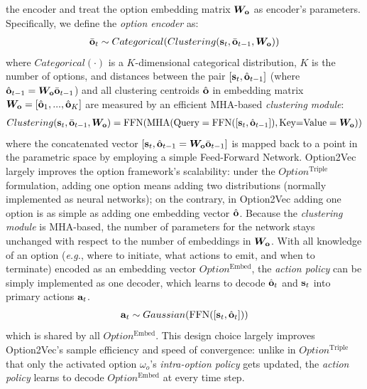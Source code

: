 \documentclass{article}
\begin{document}
the encoder and treat the option embedding matrix ${\bm{W}}_{{\mathbf{o}}}$ as
encoder's parameters. Specifically, we define the \emph{option
  encoder} as:
\begin{align}
  \label{eq:net_encoder}
  \bar{{\mathbf{o}}}_t\sim Categorical(Clustering({\mathbf{s}}_t,\bar{{\mathbf{o}}}_{t-1},{\bm{W}}_{{\mathbf{o}}}))
\end{align}
where $Categorical(\cdot)$ is a $K$-dimensional categorical distribution, $K$ is the number of options, and distances between the pair $[{\mathbf{s}}_t,\hat{{\mathbf{o}}}_{t-1}]$ (where $\hat{{\mathbf{o}}}_{t-1}={\bm{W}}_{{\mathbf{o}}}\bar{{\mathbf{o}}}_{t-1}$) and
all clustering centroids $\hat{{\mathbf{o}}}$ in embedding matrix ${\bm{W}}_{{\mathbf{o}}}=[\hat{{\mathbf{o}}}_1,...,\hat{{\mathbf{o}}}_K]$ are measured by an
efficient MHA-based \emph{clustering module}:
\vspace{-1mm}\begin{align}
  \label{eq:net_encoder}
Clustering({\mathbf{s}}_t,\bar{{\mathbf{o}}}_{t-1},{\bm{W}}_{{\mathbf{o}}})=\text{FFN}(\text{MHA}(\text{Query}=\text{FFN}([{\mathbf{s}}_t,\hat{{\mathbf{o}}}_{t-1}]),
\text{Key=Value}={\bm{W}}_{{\mathbf{o}}}))
\end{align}
where the concatenated vector $[{\mathbf{s}}_t,\hat{{\mathbf{o}}}_{t-1}={\bm{W}}_{{\mathbf{o}}}\bar{{\mathbf{o}}}_{t-1}]$ is
mapped back to a point in the parametric space by employing a
simple Feed-Forward Network. Option2Vec largely improves the
option framework's scalability: under the $Option^{\textrm{Triple}}$
formulation, adding one option means adding two distributions
(normally implemented as neural networks); on the contrary, in
Option2Vec adding one option is as simple as adding one embedding
vector $\hat{{\mathbf{o}}}$. Because the \emph{clustering module} is
MHA-based, the number of parameters for the network stays unchanged
with respect to the number of embeddings in ${\bm{W}}_{{\mathbf{o}}}$.
With all knowledge of an option (\textit{e.g.}, where to initiate, what
actions to emit, and when to terminate) encoded as an embedding vector $Option^{\textrm{Embed}}$, the
\emph{action policy} can be simply implemented as one decoder,
which learns to decode $\hat{{\mathbf{o}}}_t$ and ${\mathbf{s}}_t$ into primary
actions ${\mathbf{a}}_t$.
\begin{align}
  \label{eq:sa_net_action_sample}
  {\mathbf{a}}_t \sim Gaussian(\text{FFN}([{\mathbf{s}}_t,\hat{{\mathbf{o}}}_{t}]))
\end{align}
which is shared by all $Option^{\textrm{Embed}}$. This design choice
largely improves Option2Vec's sample efficiency and speed of
convergence: unlike in $Option^{\textrm{Triple}}$ that only the activated
option $\omega_o$'s \emph{intra-option policy} gets updated, the
\emph{action policy} learns to decode $Option^{\textrm{Embed}}$ at every
time step.
\end{document}
